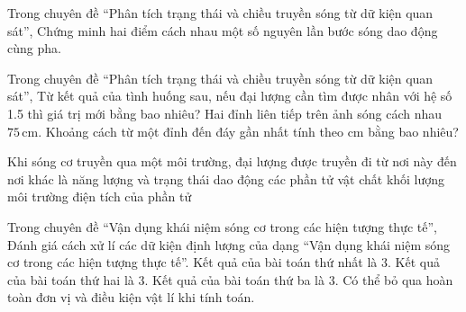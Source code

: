 \begin{ex}
Trong chuyên đề “Phân tích trạng thái và chiều truyền sóng từ dữ kiện quan sát”, Chứng minh hai điểm cách nhau một số nguyên lần bước sóng dao động cùng pha.
\choiceTF

\end{ex}

\begin{ex}
Trong chuyên đề “Phân tích trạng thái và chiều truyền sóng từ dữ kiện quan sát”, Từ kết quả của tình huống sau, nếu đại lượng cần tìm được nhân với hệ số 1.5 thì giá trị mới bằng bao nhiêu? Hai đỉnh liên tiếp trên ảnh sóng cách nhau $75\,\text{cm}$. Khoảng cách từ một đỉnh đến đáy gần nhất tính theo cm bằng bao nhiêu?
\end{ex}

\begin{ex}
Khi sóng cơ truyền qua một môi trường, đại lượng được truyền đi từ nơi này đến nơi khác là
\choice
{\True năng lượng và trạng thái dao động}
{các phần tử vật chất}
{khối lượng môi trường}
{điện tích của phần tử}
\end{ex}

\begin{ex}
Trong chuyên đề “Vận dụng khái niệm sóng cơ trong các hiện tượng thực tế”, Đánh giá cách xử lí các dữ kiện định lượng của dạng “Vận dụng khái niệm sóng cơ trong các hiện tượng thực tế”.
\choiceTF
{\True Kết quả của bài toán thứ nhất là 3.}
{\True Kết quả của bài toán thứ hai là 3.}
{\True Kết quả của bài toán thứ ba là 3.}
{Có thể bỏ qua hoàn toàn đơn vị và điều kiện vật lí khi tính toán.}
\end{ex}

